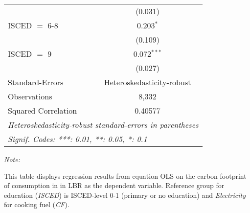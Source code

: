 \begin{table}[htbp!]
\begin{adjustbox}{width = 1\textwidth, max height = 0.95\textheight, center}
\begin{threeparttable}[b]
\begin{tabular}{lc}
                                & (0.031)\\   
            ISCED $=$ 6-8       & 0.203$^{*}$\\   
                                & (0.109)\\   
            ISCED $=$ 9         & 0.072$^{***}$\\   
                                & (0.027)\\   
            \midrule 
            Standard-Errors     & Heteroskedasticity-robust \\   
            Observations        & 8,332\\  
            Squared Correlation & 0.40577\\  
            \midrule \midrule
            \multicolumn{2}{l}{\emph{Heteroskedasticity-robust standard-errors in parentheses}}\\
            \multicolumn{2}{l}{\emph{Signif. Codes: ***: 0.01, **: 0.05, *: 0.1}}\\
         \end{tabular}
         
         \begin{tablenotes}\item \medskip \textit{Note:}
            \item This table displays regression results from equation OLS on the carbon footprint of consumption in  in LBR as the dependent variable.  Reference group for education (\textit{ISCED}) is ISCED-level 0-1 (primary or no education) and \textit{Electricity} for cooking fuel (\textit{CF}).
         \end{tablenotes}
      \end{threeparttable}
   \end{adjustbox}
\end{table}


